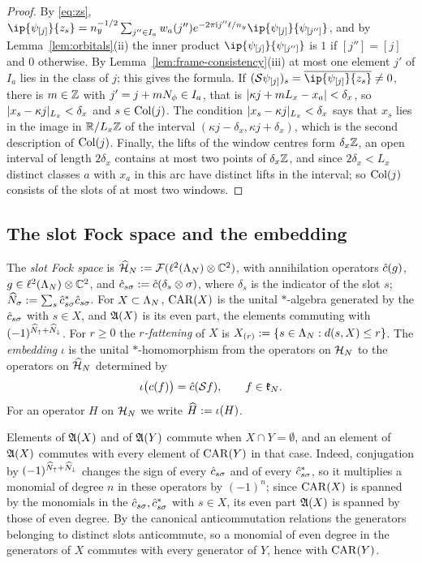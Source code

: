 \begin{proof}
By \eqref{eq:zs}, $\ip{\psi_{[j]}}{z_s}=\ny^{-1/2}\sum_{j''\in I_a}w_a(j'')e^{-2\pi\iu j''\ell/\ny}\ip{\psi_{[j]}}{\psi_{[j'']}}$,
and by Lemma~\ref{lem:orbitals}(ii) the inner product $\ip{\psi_{[j]}}{\psi_{[j'']}}$ is $1$ if $[j'']=[j]$ and $0$
otherwise. By Lemma~\ref{lem:frame-consistency}(iii) at most one element $j'$ of $I_a$ lies in the class of $j$; this
gives the formula. If $(\Sa\psi_{[j]})_s=\overline{\ip{\psi_{[j]}}{z_s}}\ne0$, there is $m\in\mathbb{Z}$ with
$j'=j+mN_{\phi}\in I_a$, that is $\lvert\kappa j+mL_x-x_a\rvert<\delta_x$, so $\lvert x_s-\kappa j\rvert_{L_x}<\delta_x$ and $s\in\mathrm{Col}(j)$.
The condition $\lvert x_s-\kappa j\rvert_{L_x}<\delta_x$ says that $x_s$ lies in the image in $\mathbb{R}/L_x\mathbb{Z}$ of the interval
$(\kappa j-\delta_x,\kappa j+\delta_x)$, which is the second description of $\mathrm{Col}(j)$. Finally, the lifts of the window
centres form $\delta_x\mathbb{Z}$, an open interval of length $2\delta_x$ contains at most two points of $\delta_x\mathbb{Z}$, and since
$2\delta_x<L_x$ distinct classes $a$ with $x_a$ in this arc have distinct lifts in the interval; so $\mathrm{Col}(j)$ consists of
the slots of at most two windows.
\end{proof}

\subsection{The slot Fock space and the embedding}

\begin{definition}\label{def:slotfock}
The \emph{slot Fock space} is $\widehat{\mathcal{H}}_N:=\mathcal{F}(\ell^2(\Lambda_N)\otimes\mathbb{C}^2)$, with annihilation operators $\hat{c}(g)$,
$g\in\ell^2(\Lambda_N)\otimes\mathbb{C}^2$, and $\hat{c}_{s\sigma}:=\hat{c}(\delta_s\otimes\sigma)$, where $\delta_s$ is the
indicator of the slot $s$; $\widehat{N}_{\sigma}:=\sum_s\hat{c}_{s\sigma}^*\hat{c}_{s\sigma}$. For $X\subset\Lambda_N$, $\mathrm{CAR}(X)$
is the unital $*$-algebra generated by the $\hat{c}_{s\sigma}$ with $s\in X$, and $\mathfrak{A}(X)$ is its even part,
the elements commuting with $(-1)^{\widehat{N}_{{\uparrow}}+\widehat{N}_{{\downarrow}}}$. For $r\ge0$ the \emph{$r$-fattening} of $X$ is
$X_{(r)}:=\{s\in\Lambda_N:d(s,X)\le r\}$. The \emph{embedding} $\iota$ is the unital $*$-homomorphism from the
operators on $\mathcal{H}_N$ to the operators on $\widehat{\mathcal{H}}_N$ determined by
\[
\iota\bigl(c(f)\bigr)=\hat{c}(\mathcal{S} f),\qquad f\in\mathfrak{k}_N .
\]
For an operator $H$ on $\mathcal{H}_N$ we write $\widehat{H}:=\iota(H)$.
\end{definition}

Elements of $\mathfrak{A}(X)$ and of $\mathfrak{A}(Y)$ commute when $X\cap Y=\emptyset$, and an element of $\mathfrak{A}(X)$ commutes
with every element of $\mathrm{CAR}(Y)$ in that case. Indeed, conjugation by $(-1)^{\widehat{N}_{{\uparrow}}+\widehat{N}_{{\downarrow}}}$ changes the sign of
every $\hat{c}_{s\sigma}$ and of every $\hat{c}_{s\sigma}^*$, so it multiplies a monomial of degree $n$ in these operators
by $(-1)^n$; since $\mathrm{CAR}(X)$ is spanned by the monomials in the $\hat{c}_{s\sigma},\hat{c}^*_{s\sigma}$ with $s\in X$,
its even part $\mathfrak{A}(X)$ is spanned by those of even degree. By the canonical anticommutation relations the
generators belonging to distinct slots anticommute, so a monomial of even degree in the generators of $X$ commutes
with every generator of $Y$, hence with $\mathrm{CAR}(Y)$.

